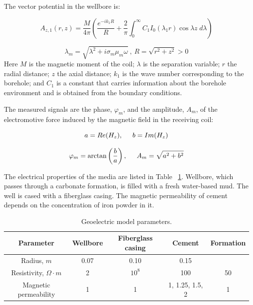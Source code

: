 \documentclass[10pt,twoside]{article}
\begin{document}
The vector potential in the wellbore is:

\begin{equation}
A_{z, 1}(r,z) = \frac{M}{4\pi} \left( \frac{ e^{-ik_1 R}}{R} + \frac{2}{\pi} {\int_0^\infty C_1 I_0 (\lambda_1 r) \cos \lambda z \; d \lambda}\right)
\end{equation}

\begin{equation}
\lambda_m = \sqrt{\lambda^2 + i \sigma_m \mu_m  \omega }\: , \: R = \sqrt{r^2+z^2}>0
\end{equation}
Here $M$ is the magnetic moment of the coil; $\lambda$ is the separation variable; $r$ the radial distance; $z$ the axial distance; $k_1$ is the wave number corresponding to the borehole; and $C_1$ is a constant that carries information about the borehole environment and is obtained from the boundary conditions.

The measured signals are the phase, $\varphi_m$, and the amplitude, $A_m$, of the electromotive force induced by the magnetic field in the receiving coil:

\begin{equation}
a = Re(H_{z}) , \hspace{0.5cm}
b = Im(H_{z})
\end{equation}



\begin{equation}
\varphi_m = \arctan \left( \frac{b}{a} \right), \hspace{0.5cm}
A_m =  {\sqrt{a^2+b^2}}
\label{varphi}
\end{equation}

The electrical properties of the media are listed in Table ~\ref{geoelectric_table}. Wellbore, which passes through a carbonate formation, is filled with a fresh water-based mud. The well is cased with a fiberglass casing. The magnetic permeability of cement depends on the concentration of iron powder in it.

\begin{table}
\begin{center}


\begin{tabular}{|c|c|c|c|c|}
\hline
\textbf{Parameter} & \textbf{Wellbore} & \textbf{Fiberglass casing}& \textbf{Cement} & \textbf{Formation} \\
\hline
Radius, $m$             & 0.07 & 0.10 & 0.15 &  \\
Resistivity, $\Omega\cdot m$    & 2 & $10^8$ & 100 & 50 \\
Magnetic permeability & 1 & 1 & 1, 1.25, 1.5, 2 & 1  \\
\hline

\end{tabular}
\caption{Geoelectric model parameters.}
\label{geoelectric_table}
\end{center}
\end{table}
\end{document}
